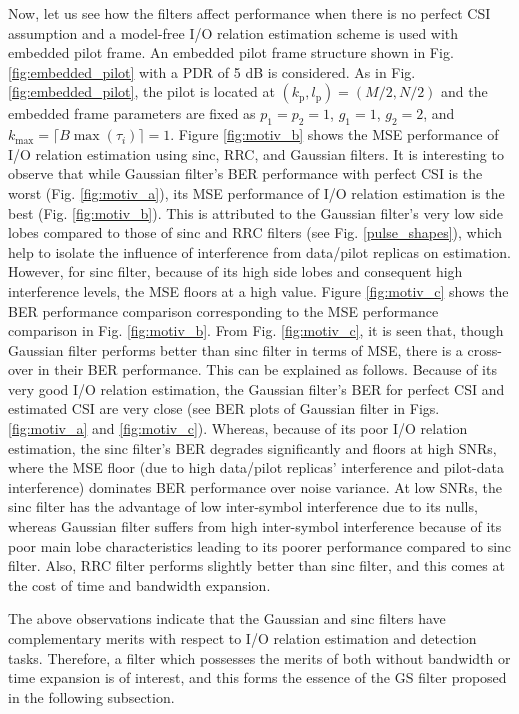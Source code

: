 Now, let us see how the filters affect performance when there is no perfect CSI assumption and a model-free I/O relation estimation scheme is used with embedded pilot frame. An embedded pilot frame structure shown in Fig. \ref{fig:embedded_pilot} with a PDR of 5 dB is considered.
As in Fig. \ref{fig:embedded_pilot}, the pilot is located at $(k_{\text{p}},l_{\text{p}})=(M/2,N/2)$  and the embedded frame parameters are fixed as $p_1=p_2=1$, $g_1=1$, $g_2=2$,  and $k_{\text{max}}=\lceil B\max(\tau_{i}) \rceil=1 $. Figure \ref{fig:motiv_b} shows the MSE performance of I/O relation estimation using sinc, RRC, and Gaussian filters. It is interesting to observe that while Gaussian filter's BER performance with perfect CSI is the worst (Fig. \ref{fig:motiv_a}), its MSE performance of I/O relation estimation is the best (Fig. \ref{fig:motiv_b}). This is attributed to the Gaussian filter's very low side lobes compared to those of sinc and RRC filters (see Fig. \ref{pulse_shapes}), which help to isolate the influence of interference from data/pilot replicas on estimation. However, for sinc filter, because of its high side lobes and consequent high interference levels, the MSE floors at a high value.  Figure \ref{fig:motiv_c} shows the BER performance comparison corresponding to the MSE performance comparison in Fig. \ref{fig:motiv_b}. From Fig. \ref{fig:motiv_c}, it is seen that, though Gaussian filter performs better than sinc filter in terms of MSE, there is a cross-over in their BER performance. This can be explained as follows. Because of its very good I/O relation estimation, the Gaussian filter's BER for perfect CSI and estimated CSI are very close (see BER plots of Gaussian filter in Figs. \ref{fig:motiv_a} and \ref{fig:motiv_c}). Whereas, because of its poor I/O relation estimation, the sinc filter's BER degrades significantly and floors at high SNRs, where the MSE floor (due to high data/pilot replicas' interference and pilot-data interference) dominates BER performance over noise variance. At low SNRs, the sinc filter has the advantage of low inter-symbol interference due to its nulls, whereas Gaussian filter suffers from high inter-symbol interference because of its poor main lobe characteristics leading to its poorer performance compared to sinc filter. Also, RRC filter performs slightly better than sinc filter, and this comes at the cost of time and bandwidth expansion.    
 
The above observations indicate that the Gaussian and sinc filters have complementary merits with respect to I/O relation estimation and detection tasks. Therefore, a filter which possesses the merits of both without bandwidth or time expansion is of interest, and this forms the essence of the GS filter proposed in the following subsection.

